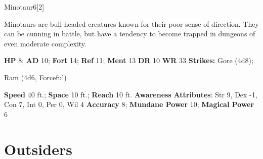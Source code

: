   \begin{monsection}{Minotaur}{6}[2]
    \vspace{-1em}\vspace{-1em}
    \vspace{0em}

    
      Minotaurs are bull-headed creatures known for their poor sense of direction.
      They can be cunning in battle, but have a tendency to become trapped in dungeons of even moderate complexity.
    

    \begin{spellcontent}
      \begin{spelltargetinginfo}
        \pari \textbf{HP} 8;
          \textbf{AD} 10;
          \textbf{Fort} 14;
          \textbf{Ref} 11;
          \textbf{Ment} 13
        \pari \textbf{DR} 10
        \pari \textbf{WR} 33
        \pari \textbf{Strikes:}
            Gore  (4d8);
\par Ram  (4d6, Forceful)
      \end{spelltargetinginfo}
    \end{spellcontent}
    \begin{monsterfooter}
      \pari \textbf{Speed} 40 ft.;
        \textbf{Space} 10 ft.;
        \textbf{Reach} 10 ft.
      \pari \textbf{Awareness} 
      \pari \textbf{Attributes}:
        Str 9, Dex -1,
        Con 7, Int 0,
        Per 0, Wil 4
      \pari \textbf{Accuracy} 8;
        \textbf{Mundane Power} 10;
      \textbf{Magical Power} 6
    \end{monsterfooter}
  \end{monsection}
  
  
        \section{Outsiders}
      
